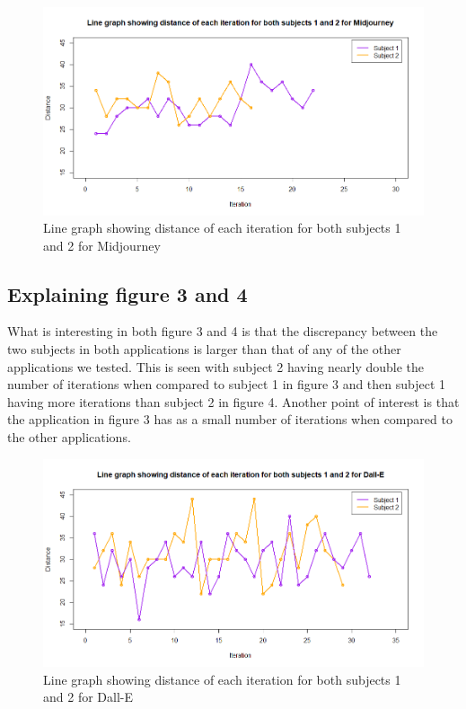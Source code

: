 \documentclass[]{report}
\begin{document}
	\begin{figure}[!htbp]
		\centering
		\includegraphics[width=1\linewidth, trim=0 0 0 50, clip]{LineGraphMidJ}
		\caption{Line graph showing distance of each iteration for both subjects 1 and 2 for Midjourney}
		\label{fig:linegraphmidj}
	\end{figure}
	
	\subsection{Explaining figure 3 and 4}
	
	What is interesting in both figure 3 and 4 is that the discrepancy between the two subjects in both applications is larger than that of any of the other applications we tested. This is seen with subject 2 having nearly double the number of iterations when compared to subject 1 in figure 3 and then subject 1 having more iterations than subject 2 in figure 4. Another point of interest is that the application in figure 3 has as a small number of iterations when compared to the other applications. 
	\begin{figure}[!htbp]
		\centering
		\includegraphics[width=1\linewidth, trim=0 0 0 50, clip]{LineGraphDall-E}
		\caption{Line graph showing distance of each iteration for both subjects 1 and 2 for Dall-E}
		\label{fig:linegraphdall-e}
	\end{figure}
	
\end{document}
